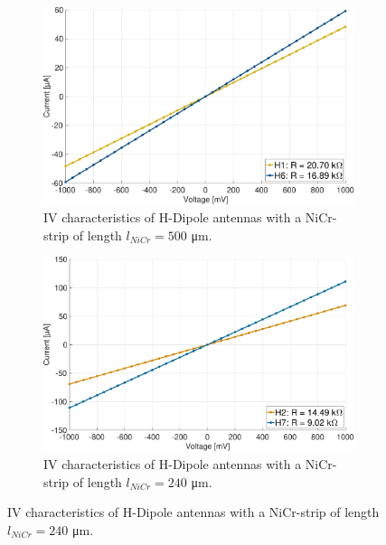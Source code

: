 \begin{figure}[ht]
    \centering

    \begin{subfigure}[b]{0.49\textwidth}
        \centering
        \includegraphics[width=\textwidth]{figures/IV/IV_H1_H6.pdf}
        \caption{IV characteristics of H-Dipole antennas with a NiCr-strip of length $l_{NiCr} = 500$ \si{\micro \meter}.}
        \label{fig:sub1}
    \end{subfigure}
    \hfill
    \begin{subfigure}[b]{0.49\textwidth}
        \centering
        \includegraphics[width=\textwidth]{figures/IV/IV_H2_H7.pdf}
        \caption{IV characteristics of H-Dipole antennas with a NiCr-strip of length $l_{NiCr} = 240$ \si{\micro \meter}.}
        \label{fig:sub2}
    \end{subfigure}
    
    \vspace{1em} %


\end{figure}
